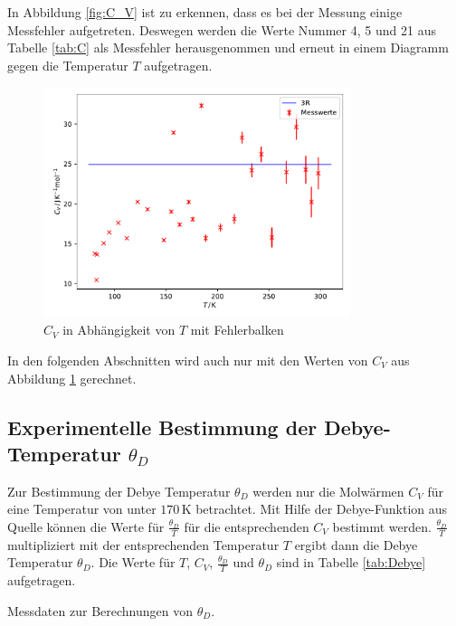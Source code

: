 In Abbildung \ref{fig:C_V} ist zu erkennen, dass es bei der Messung einige Messfehler aufgetreten. Deswegen werden die Werte Nummer 4, 5 und 21 aus Tabelle \ref{tab:C} als Messfehler herausgenommen und erneut in einem Diagramm gegen die Temperatur $T$ aufgetragen.

\begin{figure}[H]
    \centering
    \includegraphics[width=0.8\textwidth]{build/C_V_gefiltert.pdf}
    \caption{$C_V$ in Abhängigkeit von $T$ mit Fehlerbalken}
    \label{fig:C_V_gefiltert}
\end{figure}

In den folgenden Abschnitten wird auch nur mit den Werten von $C_V$ aus Abbildung \ref{fig:C_V_gefiltert} gerechnet.

\subsection[Experimentelle Bestimmung der Debye-Temperatur]{Experimentelle Bestimmung der Debye-Temperatur $\theta_D$}
\label{sec:debye_temp}

Zur Bestimmung der Debye Temperatur $\theta_D$ werden nur die Molwärmen $C_V$ für eine Temperatur von unter $170 \, \mathrm{K}$ betrachtet. Mit Hilfe der Debye-Funktion aus Quelle \cite{Anleitung} können die Werte für $\frac{\theta_D}{T}$ für die entsprechenden $C_V$ bestimmt werden. $\frac{\theta_D}{T}$ multipliziert mit der entsprechenden Temperatur $T$ ergibt dann die Debye Temperatur $\theta_D$. Die Werte für $T$, $C_V$, $\frac{\theta_D}{T}$ und $\theta_D$ sind in Tabelle \ref{tab:Debye} aufgetragen.

\begin{table}
    \centering
    \caption{Messdaten zur Berechnungen von $\theta_D$. }
    \label{tab:Debye}
\end{table}

